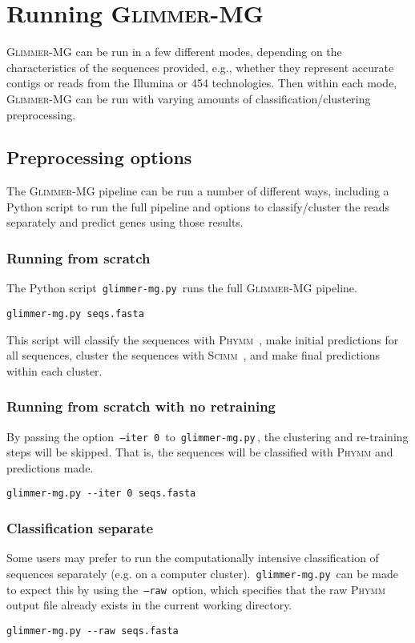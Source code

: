 \documentclass[fleqn,titlepage,11pt]{article}
\def\Gmg{\textsc{Glimmer-MG}}
\def\Phymm{\textsc{Phymm}}
\def\Scimm{\textsc{Scimm}}
\def\Pg#1{\texttt{#1}}
\begin{document}
\section{Running \Gmg{}}
\Gmg{} can be run in a few different modes, depending on the
characteristics of the sequences provided, e.g., whether they
represent accurate contigs or reads from the Illumina or 454
technologies. Then within each mode, \Gmg{} can be run with varying
amounts of classification/clustering preprocessing.

\subsection{Preprocessing options}
The \Gmg{} pipeline can be run a number of different ways, including a
Python script to run the full pipeline and options to classify/cluster
the reads separately and predict genes using those results.

\subsubsection{Running from scratch}
The Python script \,\Pg{glimmer-mg.py}\, runs the full \Gmg{}
pipeline.
\BSV
\begin{verbatim}
glimmer-mg.py seqs.fasta
\end{verbatim}
\ESV
This script will classify the sequences with \Phymm{}~\cite{phymm},
make initial predictions for all sequences, cluster the sequences with
\Scimm{}~\cite{scimm}, and make final predictions within each cluster.

\subsubsection{Running from scratch with no retraining}
By passing the option \,\Pg{--iter 0}\, to \,\Pg{glimmer-mg.py}\,, the
clustering and re-training steps will be skipped. That is, the
sequences will be classified with \Phymm{} and predictions made.
\BSV
\begin{verbatim}
glimmer-mg.py --iter 0 seqs.fasta
\end{verbatim}
\ESV

\subsubsection{Classification separate}
Some users may prefer to run the computationally intensive
classification of sequences separately (e.g. on a computer cluster).
\,\Pg{glimmer-mg.py}\, can be made to expect this by using the
\,\Pg{--raw}\, option, which specifies that the raw \Phymm{} output file
already exists in the current working directory.
\BSV
\begin{verbatim}
glimmer-mg.py --raw seqs.fasta
\end{verbatim}
\ESV
\end{document}
